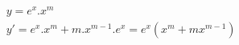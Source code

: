 \begin{ex}
\begin{align}
&y=e^x.x^m\nonumber\\
&y'=e^x.x^m+m.x^{m-1}.e^x=e^x(x^m+mx^{m-1})\nonumber
\end{align}
\end{ex}